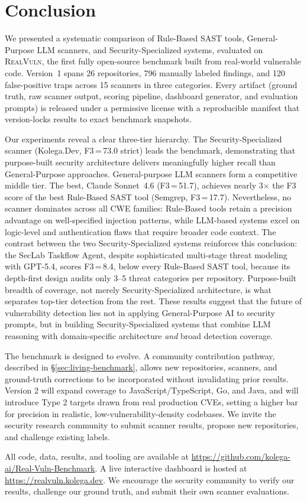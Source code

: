 \section{Conclusion}

We presented a systematic comparison of Rule-Based SAST tools, General-Purpose
LLM scanners, and Security-Specialized systems, evaluated on
\textsc{RealVuln}, the first fully open-source benchmark built from real-world
vulnerable code.  Version~1 spans 26 repositories, 796 manually labeled
findings, and 120 false-positive traps across 15 scanners in three categories.
Every artifact (ground truth, raw scanner output, scoring pipeline, dashboard
generator, and evaluation prompts) is released under a permissive license
with a reproducible manifest that version-locks results to exact benchmark
snapshots.

Our experiments reveal a clear three-tier hierarchy.  The Security-Specialized
scanner (Kolega.Dev, F3\,=\,73.0 strict) leads the benchmark, demonstrating that
purpose-built security architecture delivers meaningfully higher recall than
General-Purpose approaches.  General-purpose LLM scanners form a competitive
middle tier. The best, Claude Sonnet~4.6 (F3\,=\,51.7), achieves nearly
3$\times$ the F3 score of the best Rule-Based SAST tool (Semgrep, F3\,=\,17.7).
Nevertheless, no scanner dominates across all CWE families: Rule-Based tools
retain a precision advantage on well-specified injection patterns, while
LLM-based systems excel on logic-level and authentication flaws that require
broader code context.  The contrast between the two Security-Specialized systems reinforces this conclusion: the SecLab Taskflow Agent, despite sophisticated multi-stage threat modeling with GPT-5.4, scores F3\,=\,8.4, below every Rule-Based SAST tool, because its depth-first design audits only 3--5 threat categories per repository. Purpose-built breadth of coverage, not merely Security-Specialized architecture, is what separates top-tier detection from the rest.
These results suggest that the future of vulnerability
detection lies not in applying General-Purpose AI to security prompts, but in
building Security-Specialized systems that combine LLM reasoning with
domain-specific architecture \emph{and} broad detection coverage.

The benchmark is designed to evolve.  A community contribution pathway,
described in \S\ref{sec:living-benchmark}, allows new repositories, scanners,
and ground-truth corrections to be incorporated without invalidating prior
results.  Version 2 will expand coverage to JavaScript/TypeScript, Go, and
Java, and will introduce Type 2 targets drawn from real production CVEs,
setting a higher bar for precision in realistic, low-vulnerability-density
codebases.  We invite the security research community to submit scanner results,
propose new repositories, and challenge existing labels.

All code, data, results, and tooling are available at \url{https://github.com/kolega-ai/Real-Vuln-Benchmark}. A live interactive dashboard is hosted at \url{https://realvuln.kolega.dev}. We encourage the security community to verify our results, challenge our ground truth, and submit their own scanner evaluations.

